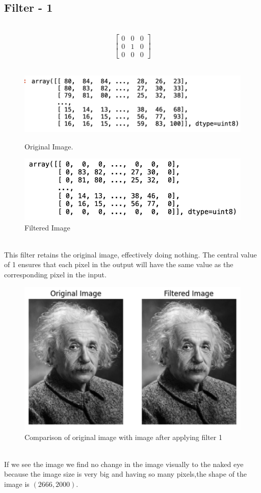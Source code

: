 \documentclass{assignment}
\begin{document}
\subsection{Filter - 1}
\\
\vspace{1.4 cm}
\[\begin{bmatrix} 0 & 0 & 0 \\ 0 & 1 & 0 \\ 0 & 0 & 0 \end{bmatrix}\]
\\
\vspace{2 cm}
\begin{figure}[h]
  \begin{minipage}{0.5\textwidth}
    \centering
    \includegraphics[width=0.8\linewidth]{image.png}
    \caption{Original Image.}
    \label{fig:original_image}
  \end{minipage}%
  \begin{minipage}{0.5\textwidth}
    \centering
    \includegraphics[width=0.8\linewidth]{f1.png}
    \caption{Filtered Image}
    \label{fig:filtered_image}
  \end{minipage}
\end{figure}
\\
This filter retains the original image, effectively doing nothing. The central value of 1 ensures that each pixel in the output will have the same value as the corresponding pixel in the input.
\begin{figure}[h]
    \centering
    \includegraphics[width=0.4\linewidth]{magic.png}
    \caption{Comparison of original image with image after applying filter 1}
    \label{fig:enter-label}
\end{figure}
\\
If we see the image we  find no change in the image visually to the naked eye because the image size is very big and having so many pixels,the shape of the image is \((2666, 2000)\).
\end{document}
